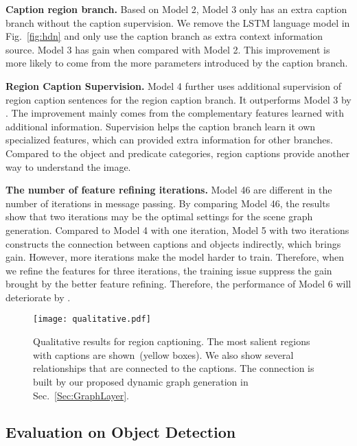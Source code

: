 \textbf{Caption region branch.} Based on Model 2, Model 3 only has an extra caption branch without the caption supervision. We remove the LSTM language model in Fig.~\ref{fig:hdn} and only use the caption branch as extra context information source. Model 3 has  gain when compared with Model 2.  This improvement is more likely to come from the more parameters introduced by the caption branch.

\textbf{Region Caption Supervision.} Model 4 further uses additional supervision of region caption sentences for the region caption branch. It outperforms Model 3 by . The improvement mainly comes from the complementary features learned with additional information.  Supervision helps the caption branch learn it own specialized features, which can provided extra information for other branches. Compared to the object and predicate categories, region captions provide another way to understand the image. 

\textbf{The number of feature refining iterations.} Model 46 are different in the number of iterations in message passing. By comparing Model 46, the results show that two iterations may be the optimal settings for the scene graph generation. Compared to Model 4 with one iteration, Model 5 with two iterations constructs the connection between captions and objects indirectly, which brings  gain. However, more iterations make the model harder to train. Therefore, when we refine the features for three iterations, the training issue suppress the gain brought by the better feature refining. Therefore, the performance of Model 6 will deteriorate by .    


\begin{figure*}[t]
	\begin{center}
		\texttt{[image: qualitative.pdf]}
	\end{center}
	\caption{Qualitative results for region captioning. The most salient regions with captions are shown~(yellow boxes). We also show several relationships that are connected to the captions. The connection is built by our proposed dynamic graph generation in Sec.~\ref{Sec:GraphLayer}. }
	\label{fig:result}
\end{figure*}





\subsection{Evaluation on Object Detection}\label{sec:object_detection}

